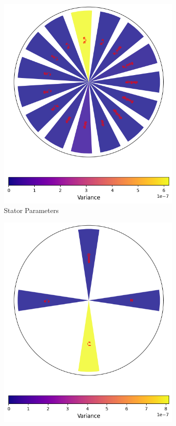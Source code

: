 \documentclass{report} %
\begin{document}
\begin{figure}[H]
\begin{subfigure}{0.32\textwidth}
        \includegraphics[width=\textwidth]{./ReportImages/stator_params.png}
        \caption{Stator Parameters}
        \label{subfig:Stator Parameters}
    \end{subfigure}\hfill
    \begin{subfigure}{0.32\textwidth}
        \centering
        \includegraphics[width=\textwidth]{./ReportImages/general_params.png}

\end{subfigure}
\end{figure}
\end{document}
